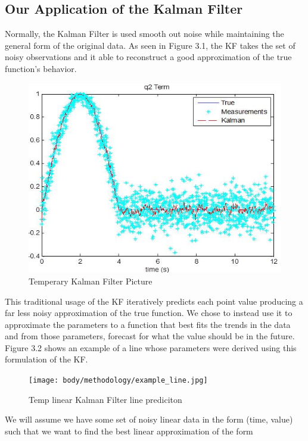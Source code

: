 \subsection{Our Application of the Kalman Filter}
Normally, the Kalman Filter is used smooth out noise while maintaining the general form of the original data. As seen in Figure 3.1, the KF takes the set of noisy observations and it able to reconstruct a good approximation of the true function's behavior.

\begin{figure}[h]
\centering
\includegraphics{body/methodology/q2_kalman.jpg}
\caption{Temperary Kalman Filter Picture}
\end{figure}

This traditional usage of the KF iteratively predicts each point value  producing a far less noisy approximation of the true function. We chose to instead use it to approximate the parameters to a function that best fits the trends in the data and from those parameters, forecast for what the value should be in the future. Figure 3.2 shows an example of a line whose parameters were derived using this formulation of the KF.

\begin{figure}[h]
\centering
\texttt{[image: body/methodology/example\_line.jpg]}
\caption{Temp linear Kalman Filter line prediciton}
\end{figure}

We will assume we have some set of noisy linear data in the form (time, value) such that we want to find the best linear approximation of the form 

